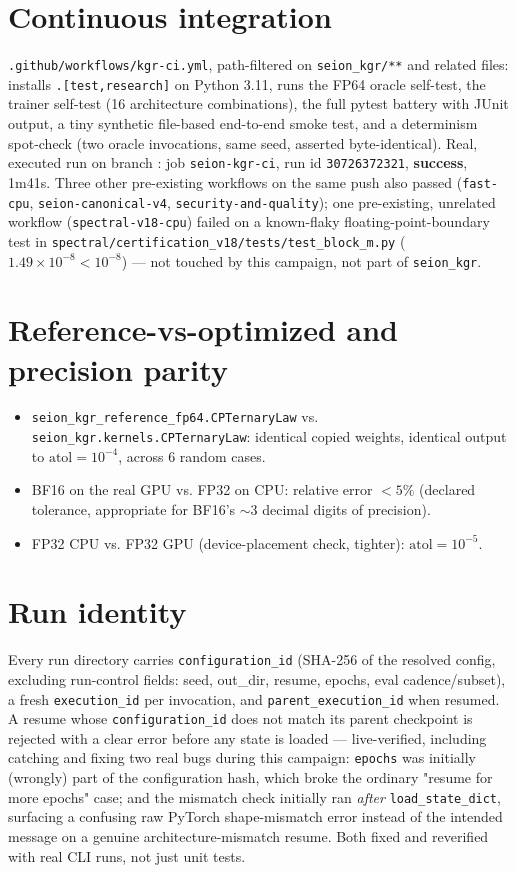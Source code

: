 \documentclass[11pt]{article}
\begin{document}
\section{Continuous integration}
\texttt{.github/workflows/kgr-ci.yml}, path-filtered on \texttt{seion\_kgr/**} and related files:
installs \texttt{.[test,research]} on Python 3.11, runs the FP64 oracle self-test, the trainer
self-test (16 architecture combinations), the full pytest battery with JUnit output, a tiny
synthetic file-based end-to-end smoke test, and a determinism spot-check (two oracle invocations,
same seed, asserted byte-identical). Real, executed run on branch
\texttt{\CampaignBranch}: job \texttt{seion-kgr-ci}, run id \texttt{30726372321}, \textbf{success},
1m41s. Three other pre-existing workflows on the same push also passed
(\texttt{fast-cpu}, \texttt{seion-canonical-v4}, \texttt{security-and-quality}); one pre-existing,
unrelated workflow (\texttt{spectral-v18-cpu}) failed on a known-flaky floating-point-boundary test
in \texttt{spectral/certification\_v18/tests/test\_block\_m.py} ($1.49\times10^{-8} < 10^{-8}$) ---
not touched by this campaign, not part of \texttt{seion\_kgr}.

\section{Reference-vs-optimized and precision parity}
\begin{itemize}
  \item \texttt{seion\_kgr\_reference\_fp64.CPTernaryLaw} vs. \texttt{seion\_kgr.kernels.CPTernaryLaw}:
        identical copied weights, identical output to $\mathrm{atol}=10^{-4}$, across 6 random
        cases.
  \item BF16 on the real GPU vs. FP32 on CPU: relative error $<5\%$ (declared tolerance,
        appropriate for BF16's $\sim$3 decimal digits of precision).
  \item FP32 CPU vs. FP32 GPU (device-placement check, tighter): $\mathrm{atol}=10^{-5}$.
\end{itemize}

\section{Run identity}
Every run directory carries \texttt{configuration\_id} (SHA-256 of the resolved config, excluding
run-control fields: seed, out\_dir, resume, epochs, eval cadence/subset), a fresh
\texttt{execution\_id} per invocation, and \texttt{parent\_execution\_id} when resumed. A resume
whose \texttt{configuration\_id} does not match its parent checkpoint is rejected with a clear
error before any state is loaded --- live-verified, including catching and fixing two real bugs
during this campaign: \texttt{epochs} was initially (wrongly) part of the configuration hash,
which broke the ordinary "resume for more epochs" case; and the mismatch check initially ran
\emph{after} \texttt{load\_state\_dict}, surfacing a confusing raw PyTorch shape-mismatch error
instead of the intended message on a genuine architecture-mismatch resume. Both fixed and
reverified with real CLI runs, not just unit tests.
\end{document}
